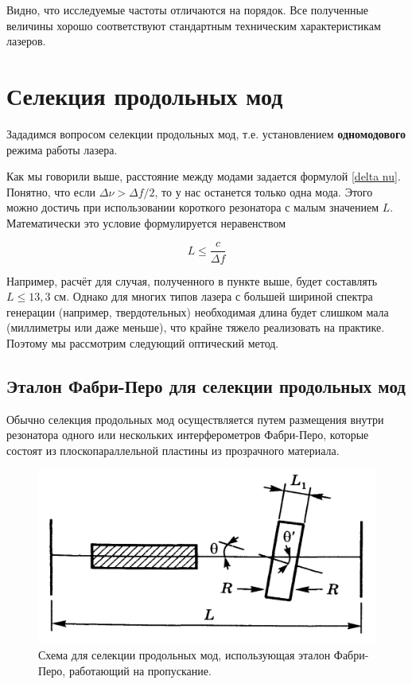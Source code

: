 \documentclass[12pt]{kiarticle}
\begin{document}
Видно, что исследуемые частоты отличаются на порядок. Все полученные величины хорошо соответствуют стандартным техническим характеристикам лазеров.

\section{Селекция продольных мод}

Зададимся вопросом селекции продольных мод, т.е. установлением \textbf{одномодового} режима работы лазера. 

Как мы говорили выше, расстояние между модами задается формулой \eqref{delta nu}. Понятно, что если $ \Delta \nu > \Delta f/2$, то у нас останется только одна мода. Этого можно достичь при использовании короткого резонатора с малым значением $ L $. Математически это условие формулируется неравенством

\begin{equation}\label{L < c/df}
L \leq \dfrac{c}{\Delta f}
\end{equation}

Например, расчёт для случая, полученного в пункте выше, будет составлять $ L \leq 13,3 $ см. Однако для многих типов лазера с большей шириной спектра генерации (например, твердотельных) необходимая длина будет слишком мала (миллиметры или даже меньше), что крайне тяжело реализовать на практике. Поэтому мы рассмотрим следующий оптический метод.

\subsection{Эталон Фабри-Перо для селекции продольных мод}

Обычно селекция продольных мод осуществляется путем размещения внутри резонатора одного или нескольких интерферометров Фабри-Перо, которые состоят из плоскопараллельной пластины из прозрачного материала. 

\begin{figure} 
	\includegraphics[width=\linewidth]{FP_selection}
	\caption{Схема для селекции продольных мод, использующая эталон 	Фабри-Перо, работающий на пропускание.}
	\label{FP_selection}
\end{figure}
\end{document}
